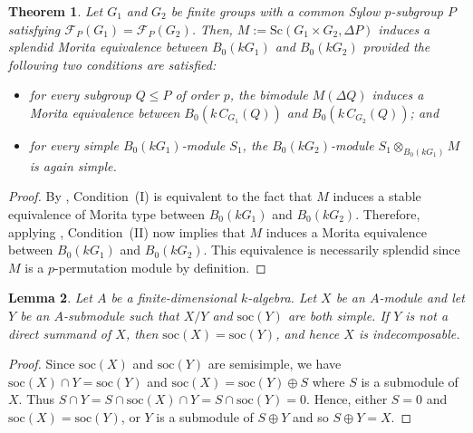 \documentclass[12pt,a4paper]{amsart}
\theoremstyle{plain}\newtheorem{Theorem}{Theorem}[section]
\theoremstyle{plain}\newtheorem{Conjecture}[Theorem]{Conjecture}
\theoremstyle{plain}\newtheorem{Corollary}[Theorem]{Corollary}
\theoremstyle{plain}\newtheorem{Lemma}[Theorem]{Lemma}
\theoremstyle{plain}\newtheorem{Proposition}[Theorem]{Proposition}
\theoremstyle{definition}\newtheorem{Definition}[Theorem]{Definition}
\theoremstyle{definition}\newtheorem{Example}[Theorem]{Example}
\theoremstyle{definition}\newtheorem{Examples}[Theorem]{Examples}
\theoremstyle{definition}\newtheorem{Remark}[Theorem]{Remark}
\theoremstyle{definition}\newtheorem{Question}[Theorem]{Question}
\theoremstyle{definition}\newtheorem{Notation}[Theorem]{Notation}
\theoremstyle{definition}\newtheorem{Hypothesis}[Theorem]{Hypothesis}
\theoremstyle{definition}\newtheorem{Assumption}[Theorem]{Assumption}
\theoremstyle{definition}\newtheorem{Strategy}[Theorem]{Strategy}
\theoremstyle{definition}\newtheorem{Contents}[Theorem]{Contents}
\theoremstyle{definition}\newtheorem{Computations}[Theorem]{Computations}
\theoremstyle{definition}\newtheorem{Equivalences}[Theorem]{Equivalences}
\theoremstyle{definition}\newtheorem{Notation/Definition}[Theorem]{Notation/Definition}
\theoremstyle{definition}\newtheorem{noth}[Theorem]{}
\theoremstyle{plain}\newtheorem{Step}[Theorem]{Step}
\def\soc{\mathrm{soc}} \def\tenOS{\otimes_{\mathcal{O}S}} \def\Tr{\mathrm{Tr}}
\begin{document}
\begin{Theorem}\label{Thm:ProveExSMEQ}
Let $G_1$ and $G_2$ be finite groups with a common Sylow $p$-subgroup $P$ 
satisfying $\mathcal F_P(G_1)=\mathcal F_P(G_2)$.  
Then, $M:={\mathrm{Sc}}(G_1\times G_2,\Delta P)$ 
induces a splendid Morita equivalence  between 
$B_0(kG_1)$ and $B_0(kG_2)$ provided the following two conditions are satisfied:
\begin{itemize}
\item[\rm(I)] for every subgroup $Q\leq P$ of order $p$, 
the bimodule $M(\Delta Q)$ 
induces a Morita equivalence between $B_0(k\,C_{G_1}(Q))$ and $B_0(k\,C_{G_2}(Q))$; and 
\item[\rm(II)] for every simple $B_0(kG_1)$-module $S_1$, the $B_0(kG_2)$-module 
$S_1\otimes_{B_0(kG_1)} M$ is again simple. 
\end{itemize}
\end{Theorem}
\begin{proof}
By \cite[Lemma~4.1]{KL20a}, Condition~(I) is equivalent to the fact that $M$
 induces a stable equivalence of Morita type
between $B_0(kG_1)$ and $B_0(kG_2)$. Therefore, applying  
\cite[Theorem 2.1]{Lin96a}, Condition~(II) now implies that $M$ 
induces a Morita equivalence between $B_0(kG_1)$ and $B_0(kG_2)$. 
This equivalence is necessarily splendid 
since $M$ is a $p$-permutation module by definition.  
\end{proof}



\begin{Lemma}\label{lem:simpleSocle}
Let $A$ be a finite-dimensional $k$-algebra. Let $X$ be an $A$-module and 
let $Y$ be an $A$-submodule such that $X/Y$ and $\soc(Y)$ are both simple.
If $Y$ is not a direct summand of $X$, then $\soc(X)=\soc(Y)$, and hence $X$ is indecomposable. 
\end{Lemma}
\begin{proof}
Since $\soc(X)$ and $\soc(Y )$ are semisimple, we have $\soc(X)\cap Y = \soc(Y )$ and $\soc(X) = \soc(Y)\oplus S$ where $S$ is a submodule of $X$. Thus $S\cap Y = S\cap \soc(X)\cap Y = S\cap \soc(Y) = 0$. Hence, either $S = 0$ and $\soc(X) = \soc(Y)$, or $Y$ is a submodule of  $S\oplus Y$ and  so $S\oplus Y =X$.
\end{proof}
\end{document}
